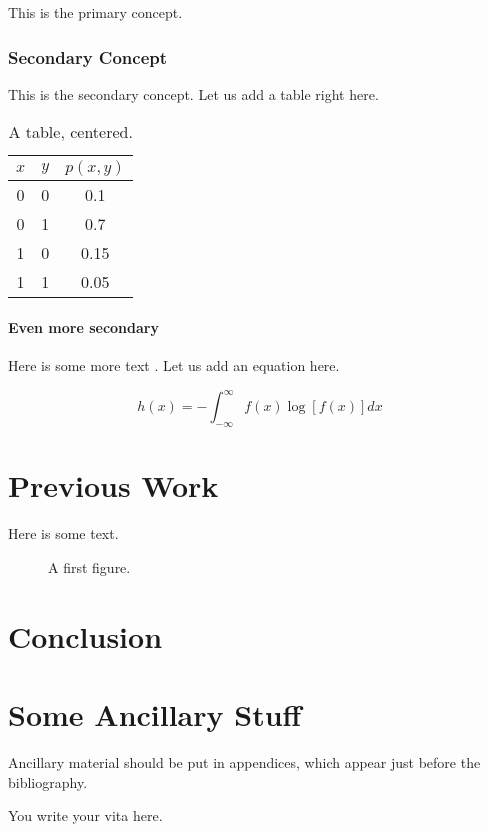 \documentclass[a4,12pt]{ozu-thesis}
\begin{document}
This is the primary concept.

\subsection{Secondary Concept}

This is the secondary concept. Let us add a table right here.

\begin{table}[h]
\caption{A table, centered.}
\begin{center}
\begin{tabular}{|c|c|c|}
 \hline \hline
$x$ & $y$ & $p(x,y)$ \\
\hline \hline
0 & 0 & 0.1 \\ \hline
0 & 1 & 0.7 \\  \hline
1 & 0 & 0.15 \\ \hline
1 & 1 & 0.05 \\ \hline \hline
\end{tabular}
\end{center}
\end{table}

\subsubsection{Even more secondary}

Here is some more text \cite{knuth:tex}. Let us add an equation here.

\begin{equation}
h(x)=-\int_{-\infty}^{\infty}f(x)\log[f(x)]dx
\end{equation}

\chapter{Previous Work}

Here is some text.

\begin{figure}[h]
\begin{center}
\end{center}
\caption{A first figure.}
\end{figure}

\chapter{Conclusion}

\nocite{*}
\appendix
\chapter{Some Ancillary Stuff}

Ancillary material should be put in appendices, which 
appear just before the bibliography. 


\begin{postliminary}
\begin{vita}
You write your vita here.
\end{vita}
\end{postliminary}
\end{document}
